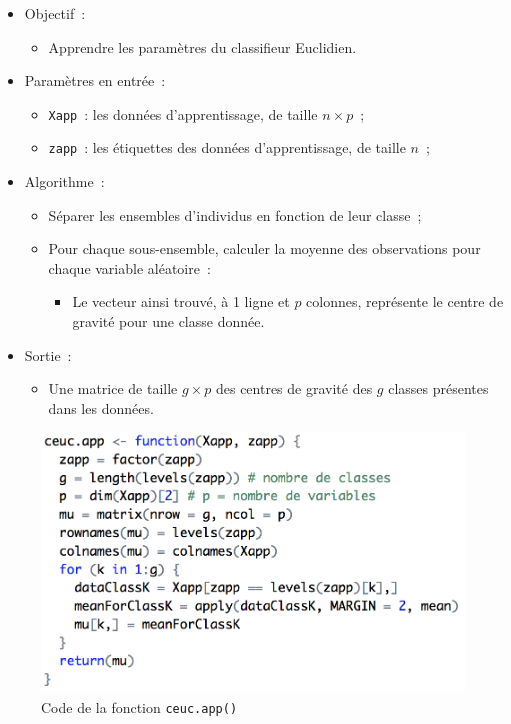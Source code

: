 \documentclass[a4paper,10pt]{report}
\begin{document}
\begin{itemize}
	\item Objectif~:
	\begin{itemize}
		\item Apprendre les paramètres du classifieur Euclidien.
	\end{itemize}
	
	\item Paramètres en entrée~:
	\begin{itemize}
		\item \texttt{Xapp}~: les données d'apprentissage, de taille $n \times p$~;
		\item \texttt{zapp}~: les étiquettes des données d'apprentissage, de taille $n$~;
	\end{itemize}
	
	\item Algorithme~:
	\begin{itemize}
		\item Séparer les ensembles d'individus en fonction de leur classe~;
		\item Pour chaque sous-ensemble, calculer la moyenne des observations pour chaque variable aléatoire~:
		\begin{itemize}
			\item Le vecteur ainsi trouvé, à 1 ligne et $p$ colonnes, représente le centre de gravité pour une classe donnée.
		\end{itemize}
	\end{itemize}
	
	\item Sortie~:
	\begin{itemize}
		\item Une matrice de taille $g \times p$ des centres de gravité des $g$ classes présentes dans les données.
	\end{itemize}
\end{itemize}
\begin{figure}[H]
	\centering
	\captionsetup{justification=centering, margin=4cm}
	\includegraphics[width=.5\linewidth]{img/1-1-1-ceuc-app-code}
	\caption{\small Code de la fonction \texttt{ceuc.app()}}	
	\label{fig:1-1-1-ceuc-app-code}%
\end{figure}
\end{document}
